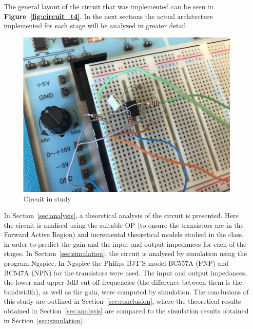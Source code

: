 The general layout of the circuit that was implemented can be seen in \textbf{Figure~\ref{fig:circuit_t4}}. In the next sections the actual architecture implemented for each stage will be analyzed in greater detail.\par
\begin{figure}[h] \centering
\includegraphics[width=0.6\linewidth]{circuit_t5.jpg}
\caption{Circuit in study}
\label{fig:circuit_t5}
\end{figure}


In Section~\ref{sec:analysis}, a theoretical analysis of the circuit is
presented. Here the circuit is analised using the suitable OP (to ensure the transistors are in the Forward Active Region) and incremental theoretical models studied in the class, in order to predict the gain and the input and output impedances for each of the stages.
In Section~\ref{sec:simulation}, the circuit is analysed by
simulation using the program Ngspice. In Ngspice the Philips BJT'S model BC557A (PNP) and BC547A (NPN) for the transistors were used. The input and output impedances, the lower and upper 3dB cut off frequencies (the difference between them is the bandwidth), as well as the gain, were computed by simulation. The conclusions of this study are outlined in
Section~\ref{sec:conclusion}, where the theoretical results obtained in
Section~\ref{sec:analysis} are compared to the simulation results obtained in
Section~\ref{sec:simulation}.





\pagebreak


